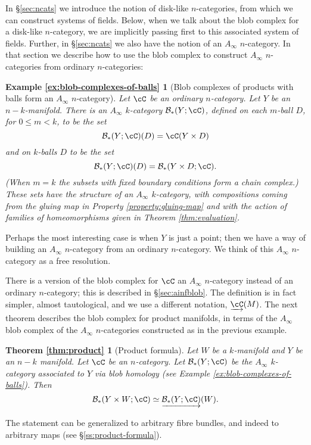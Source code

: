 In \S \ref{sec:ncats} we introduce the notion of disk-like $n$-categories, 
from which we can construct systems of fields.
Below, when we talk about the blob complex for a disk-like $n$-category, 
we are implicitly passing first to this associated system of fields.
Further, in \S \ref{sec:ncats} we also have the notion of an $A_\infty$ $n$-category. 
In that section we describe how to use the blob complex to 
construct $A_\infty$ $n$-categories from ordinary $n$-categories:

\newtheorem*{ex:blob-complexes-of-balls}{Example \ref{ex:blob-complexes-of-balls}}

\begin{ex:blob-complexes-of-balls}[Blob complexes of products with balls form an $A_\infty$ $n$-category]
Let $\cC$ be  an ordinary $n$-category.
Let $Y$ be an $n{-}k$-manifold. 
There is an $A_\infty$ $k$-category $\bc_*(Y;\cC)$, defined on each $m$-ball $D$, for $0 \leq m < k$, 
to be the set $$\bc_*(Y;\cC)(D) = \cC(Y \times D)$$ and on $k$-balls $D$ to be the set 
$$\bc_*(Y;\cC)(D) = \bc_*(Y \times D; \cC).$$ 
(When $m=k$ the subsets with fixed boundary conditions form a chain complex.) 
These sets have the structure of an $A_\infty$ $k$-category, with compositions coming from the gluing map in 
Property \ref{property:gluing-map} and with the action of families of homeomorphisms given in Theorem \ref{thm:evaluation}.
\end{ex:blob-complexes-of-balls}
\begin{rem}
Perhaps the most interesting case is when $Y$ is just a point; 
then we have a way of building an $A_\infty$ $n$-category from an ordinary $n$-category.
We think of this $A_\infty$ $n$-category as a free resolution.
\end{rem}

There is a version of the blob complex for $\cC$ an $A_\infty$ $n$-category
instead of an ordinary $n$-category; this is described in \S \ref{sec:ainfblob}.
The definition is in fact simpler, almost tautological, and we use a different notation, $\cl{\cC}(M)$. 
The next theorem describes the blob complex for product manifolds, 
in terms of the $A_\infty$ blob complex of the $A_\infty$ $n$-categories constructed as in the previous example.

\newtheorem*{thm:product}{Theorem \ref{thm:product}}

\begin{thm:product}[Product formula]
Let $W$ be a $k$-manifold and $Y$ be an $n-k$ manifold.
Let $\cC$ be an $n$-category.
Let $\bc_*(Y;\cC)$ be the $A_\infty$ $k$-category associated to $Y$ via blob homology 
(see Example \ref{ex:blob-complexes-of-balls}).
Then
\[
	\bc_*(Y\times W; \cC) \simeq \cl{\bc_*(Y;\cC)}(W).
\]
\end{thm:product}
The statement can be generalized to arbitrary fibre bundles, and indeed to arbitrary maps
(see \S \ref{ss:product-formula}).

